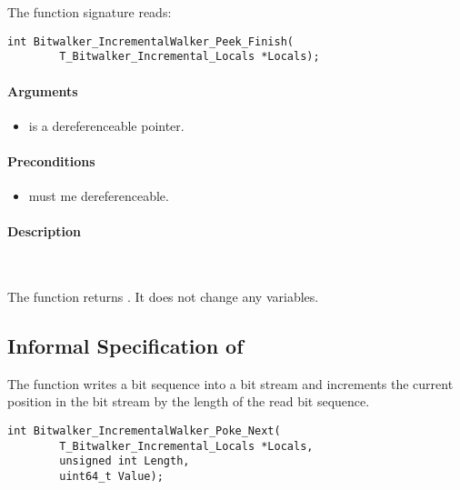  The function signature reads:\\[1em]

\begin{lstlisting}[style=acsl-block]
int Bitwalker_IncrementalWalker_Peek_Finish(
        T_Bitwalker_Incremental_Locals *Locals);
\end{lstlisting}

\paragraph{Arguments}

\begin{itemize}
   \item  {} is a dereferenceable pointer.
\end{itemize}

\paragraph{Preconditions}
\begin{itemize}
   \item  {} must me dereferenceable.
\end{itemize}

\paragraph{Description}~

The function  returns .
It does not change any variables.


\clearpage

\subsection{Informal Specification of }

The function \pokenext writes a bit sequence into a bit stream 
and increments the current position in the bit stream by the 
length of the read bit sequence.\\[1em]


\begin{lstlisting}[style=acsl-block]
int Bitwalker_IncrementalWalker_Poke_Next(
        T_Bitwalker_Incremental_Locals *Locals,
        unsigned int Length,
        uint64_t Value);
\end{lstlisting}

